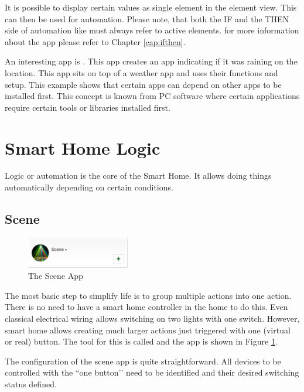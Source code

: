 It is possible to display certain values as single element in the element view. This can 
then be used for automation. Please note, that both the IF and the THEN side of automation 
like  must always refer to active elements. for more information about the 
 app please refer to Chapter \ref{cap:ifthen}.

An interesting app is . This app creates an app indicating if it 
was raining on the location. This app sits on top of a weather app and uses their 
functions and setup. This example shows that certain apps can depend on other apps 
to be installed first. This concept is known from PC software where certain applications 
require certain tools or libraries installed first.

\section{Smart Home Logic}

Logic or automation is the core of the Smart Home. It allows doing things automatically 
depending on certain conditions.

\subsection{Scene}
\label{sceneapp}

\begin{figure}
\begin{center}
\includegraphics[width=0.4\textwidth]{pngs/cap6/app7.png}
\caption{The Scene App}
\label{app7}
\end{center}
\end{figure}


The most basic step to simplify life is to group multiple actions into one action. There 
is no need to have a smart home controller in the home to do this. Even classical electrical 
wiring allows switching on two lights with one switch. However, smart home allows 
creating much larger actions just triggered with one (virtual or real) button. The tool
for this is called  and the app is shown in Figure \ref{app7}.

The configuration of the scene app is quite straightforward. All devices to be controlled 
with the ``one button’’ need to be identified and their desired switching status defined.

